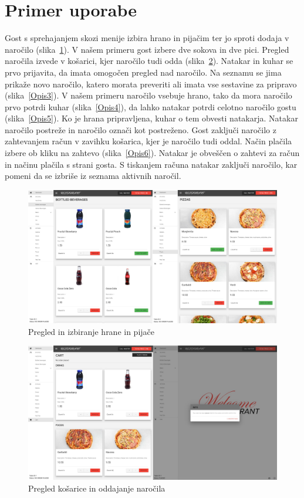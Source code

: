\documentclass[a4paper, 12pt]{book}
\begin{document}
\section{Primer uporabe}
Gost s sprehajanjem skozi menije izbira hrano in pijačim ter jo sproti dodaja v naročilo (slika~\ref{Opis1}). V našem primeru gost izbere dve sokova in dve pici. Pregled naročila izvede v košarici, kjer naročilo tudi odda (slika~\ref{Opis2}).
Natakar in kuhar se prvo prijavita, da imata omogočen pregled nad naročilo. Na seznamu se jima prikaže novo naročilo, katero morata preveriti ali imata vse sestavine za pripravo (slika~\ref{Opis3}). V našem primeru naročilo vsebuje hrano, tako da mora naročilo prvo potrdi kuhar (slika~\ref{Opis4}), da lahko natakar potrdi celotno naročilo gostu (slika~\ref{Opis5}). Ko je hrana pripravljena, kuhar o tem obvesti natakarja. Natakar naročilo postreže in naročilo označi kot postreženo. Gost zaključi naročilo z zahtevanjem račun v zavihku košarica, kjer je naročilo tudi oddal. Način plačila izbere ob kliku na zahtevo (slika~\ref{Opis6}). Natakar je obveščen o zahtevi za račun in načinu plačila s strani gosta. S tiskanjem računa natakar zaključi naročilo, kar pomeni da se izbriše iz seznama aktivnih naročil.
\begin{figure}[!htb]
\begin{center}
\includegraphics[width=14.5cm]{opis1.jpg}
\caption{Pregled in izbiranje hrane in pijače}
\label{Opis1}
\end{center}
\end{figure}
\begin{figure}[!htb]
\begin{center}
\includegraphics[width=14.5cm]{opis11.jpg}
\caption{Pregled košarice in oddajanje naročila}
\label{Opis2}
\end{center}
\end{figure}
\end{document}

